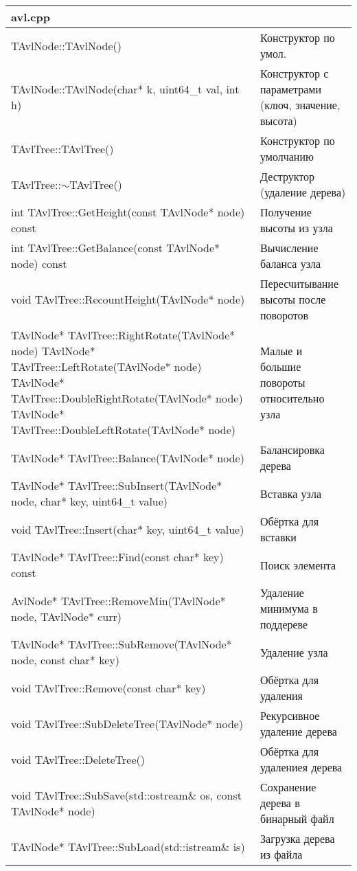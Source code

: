 \begin{longtable}{|p{10.5cm}|p{4.5cm}|}
	\hline
	\rowcolor{lightgray}
	\multicolumn{2}{|c|} {avl.cpp}\\
	\hline
	TAvlNode::TAvlNode() & Конструктор по умол.\\
	\hline
	TAvlNode::TAvlNode(char* k, uint64\_t val, int h) & Конструктор с параметрами (ключ, значение, высота)\\
	\hline
	TAvlTree::TAvlTree() & Конструктор по умолчанию\\
	\hline
	TAvlTree::$\sim$TAvlTree() & Деструктор (удаление дерева)\\
	\hline
	int TAvlTree::GetHeight(const TAvlNode* node) const & Получение высоты из узла\\
	\hline
	int TAvlTree::GetBalance(const TAvlNode* node) const & Вычисление баланса узла\\
	\hline
	void TAvlTree::RecountHeight(TAvlNode* node) & Пересчитывание высоты после поворотов\\
	\hline
	TAvlNode* TAvlTree::RightRotate(TAvlNode* node)
	TAvlNode* TAvlTree::LeftRotate(TAvlNode* node)
	TAvlNode* TAvlTree::DoubleRightRotate(TAvlNode* node)
	TAvlNode* TAvlTree::DoubleLeftRotate(TAvlNode* node)
	 & Малые и большие повороты относительно узла\\
	\hline
	TAvlNode* TAvlTree::Balance(TAvlNode* node) & Балансировка дерева\\
	\hline
	TAvlNode* TAvlTree::SubInsert(TAvlNode* node, char* key, uint64\_t value) & Вставка узла\\
	\hline
	void TAvlTree::Insert(char* key, uint64\_t value) & Обёртка для вставки\\
	\hline
	TAvlNode* TAvlTree::Find(const char* key) const & Поиск элемента\\
	\hline
	AvlNode* TAvlTree::RemoveMin(TAvlNode* node, TAvlNode* curr) & Удаление минимума в поддереве\\
	\hline
	TAvlNode* TAvlTree::SubRemove(TAvlNode* node, const char* key) & Удаление узла \\
	\hline
	void TAvlTree::Remove(const char* key) & Обёртка для удаления\\
	\hline
	void TAvlTree::SubDeleteTree(TAvlNode* node) & Рекурсивное удаление дерева\\
	\hline
	void TAvlTree::DeleteTree() & Обёртка для удалениея дерева\\
	\hline
	void TAvlTree::SubSave(std::ostream\& os, const TAvlNode* node) & Сохранение дерева в бинарный файл\\
	\hline
	TAvlNode* TAvlTree::SubLoad(std::istream\& is) & Загрузка дерева из файла\\
	\hline
	\end{longtable}

